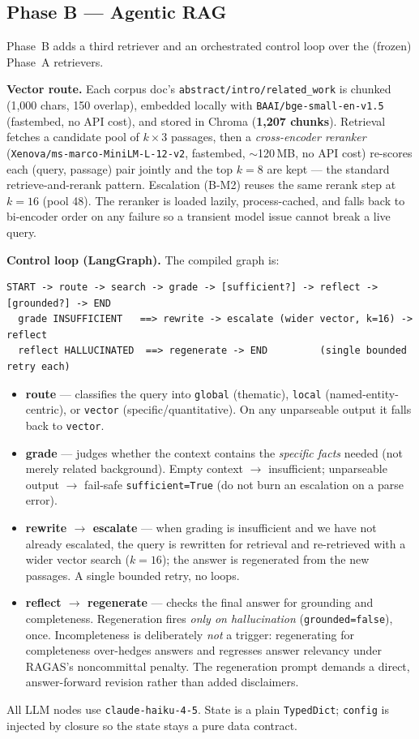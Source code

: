 \documentclass[11pt]{article}
\begin{document}
\subsection{Phase B --- Agentic RAG}
Phase~B adds a third retriever and an orchestrated control loop over the (frozen) Phase~A retrievers.

\textbf{Vector route.} Each corpus doc's \texttt{abstract/intro/related\_work} is chunked (1{,}000 chars, 150 overlap), embedded locally with \texttt{BAAI/bge-small-en-v1.5} (fastembed, no API cost), and stored in Chroma (\textbf{1{,}207 chunks}). Retrieval fetches a candidate pool of $k\times 3$ passages, then a \emph{cross-encoder reranker} (\texttt{Xenova/ms-marco-MiniLM-L-12-v2}, fastembed, $\sim$120\,MB, no API cost) re-scores each (query, passage) pair jointly and the top $k{=}8$ are kept --- the standard retrieve-and-rerank pattern. Escalation (B-M2) reuses the same rerank step at $k{=}16$ (pool 48). The reranker is loaded lazily, process-cached, and falls back to bi-encoder order on any failure so a transient model issue cannot break a live query.

\textbf{Control loop (LangGraph).} The compiled graph is:
\begin{verbatim}
START -> route -> search -> grade -> [sufficient?] -> reflect -> [grounded?] -> END
  grade INSUFFICIENT   ==> rewrite -> escalate (wider vector, k=16) -> reflect
  reflect HALLUCINATED  ==> regenerate -> END         (single bounded retry each)
\end{verbatim}
\begin{itemize}
  \item \textbf{route} --- classifies the query into \texttt{global} (thematic), \texttt{local} (named-entity-centric), or \texttt{vector} (specific/quantitative). On any unparseable output it falls back to \texttt{vector}.
  \item \textbf{grade} --- judges whether the context contains the \emph{specific facts} needed (not merely related background). Empty context $\to$ insufficient; unparseable output $\to$ fail-safe \texttt{sufficient=True} (do not burn an escalation on a parse error).
  \item \textbf{rewrite $\to$ escalate} --- when grading is insufficient and we have not already escalated, the query is rewritten for retrieval and re-retrieved with a wider vector search ($k{=}16$); the answer is regenerated from the new passages. A single bounded retry, no loops.
  \item \textbf{reflect $\to$ regenerate} --- checks the final answer for grounding and completeness. Regeneration fires \emph{only on hallucination} (\texttt{grounded=false}), once. Incompleteness is deliberately \emph{not} a trigger: regenerating for completeness over-hedges answers and regresses answer relevancy under RAGAS's noncommittal penalty. The regeneration prompt demands a direct, answer-forward revision rather than added disclaimers.
\end{itemize}
All LLM nodes use \texttt{claude-haiku-4-5}. State is a plain \texttt{TypedDict}; \texttt{config} is injected by closure so the state stays a pure data contract.
\end{document}

